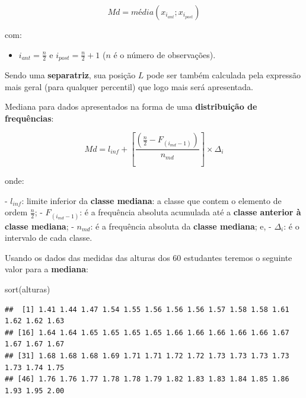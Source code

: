\documentclass[
]{book}
\newenvironment{Shaded}{\begin{snugshade}}{\end{snugshade}}
\newcommand{\FunctionTok}[1]{\textcolor[rgb]{0.00,0.00,0.00}{#1}}
\newcommand{\NormalTok}[1]{#1}
\providecommand{\tightlist}{%
  \setlength{\itemsep}{0pt}\setlength{\parskip}{0pt}}
\begin{document}
\hfill\break

\[
Md=média(x_{i_{ant}} ; x_{i_{post}})
\]

\hfill\break

com:

\hfill\break

\begin{itemize}
\tightlist
\item
  \(i_{ant} = \frac{n}{2}\) e \(i_{post} =\frac{n}{2}+1\) (\(n\) é o número de observações).
\end{itemize}

\hfill\break

Sendo uma \textbf{separatriz}, sua posição \(L\) pode ser também calculada pela expressão mais geral (para qualquer percentil) que logo mais será apresentada.

\hfill\break

Mediana para dados apresentados na forma de uma \textbf{distribuição de frequências}:

\hfill\break

\[
Md = l_{inf} + [ \frac{(\frac{n}{2} -  F_{(i_{md}-1)})}{n_{md}} ]\times \Delta_{i}
\]

\hfill\break

onde:

\hfill\break
- \(l_{inf}\): limite inferior da \textbf{classe mediana}: a classe que contem o elemento de ordem \(\frac{n}{2}\);
- \(F_{(i_{md}-1)}\): é a frequência absoluta acumulada até a \textbf{classe anterior à classe mediana};
- \(n_{md}\): é a frequência absoluta da \textbf{classe mediana}; e,
- \(\Delta_{i}\): é o intervalo de cada classe.

\hfill\break

Usando os dados das medidas das alturas dos 60 estudantes teremos o seguinte valor para a \textbf{mediana}:

\hfill\break

\begin{Shaded}
\begin{Highlighting}[]
\FunctionTok{sort}\NormalTok{(alturas)}
\end{Highlighting}
\end{Shaded}

\begin{verbatim}
##  [1] 1.41 1.44 1.47 1.54 1.55 1.56 1.56 1.56 1.57 1.58 1.58 1.61 1.62 1.62 1.63
## [16] 1.64 1.64 1.65 1.65 1.65 1.65 1.66 1.66 1.66 1.66 1.66 1.67 1.67 1.67 1.67
## [31] 1.68 1.68 1.68 1.69 1.71 1.71 1.72 1.72 1.73 1.73 1.73 1.73 1.73 1.74 1.75
## [46] 1.76 1.76 1.77 1.78 1.78 1.79 1.82 1.83 1.83 1.84 1.85 1.86 1.93 1.95 2.00
\end{verbatim}
\end{document}
